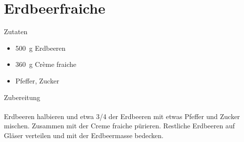 \section*{Erdbeerfraiche}
\ihead{}\ohead{}
\cfoot{}
{\Large Zutaten}
\begin{multicols}{2}
\begin{itemize}
    \item \SI{500}{g} Erdbeeren
    \item \SI{360}{g} Crème fraiche
    \item Pfeffer, Zucker
\end{itemize}
\end{multicols}
\noindent
{\Large Zubereitung}\\
\\
Erdbeeren halbieren und etwa 3/4 der Erdbeeren mit etwas Pfeffer und Zucker mischen.
Zusammen mit der Creme fraiche pürieren.
Restliche Erdbeeren auf Gläser verteilen und mit der Erdbeermasse bedecken.
